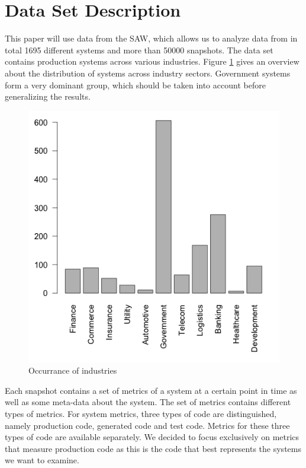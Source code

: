 \section{Data Set Description}
\label{sec:datasetdescription}
This paper will use data from the SAW, which allows us to analyze data from  in total 1695 different systems and more than 50000 snapshots. The data set contains production systems across various industries. Figure \ref{fig:industries} gives an overview about the distribution of systems across industry sectors. Government systems form a very dominant group, which should be taken into account before generalizing the results.

\begin{figure}
\centering
\includegraphics[width=\linewidth]{figs/ind_occ.png}
\caption{Occurrance of industries}
\label{fig:industries}
\end{figure}

Each snapshot contains a set of metrics of a system at a certain point in time as well as some meta-data about the system. The set of metrics contains different types of metrics. For system metrics, three types of code are distinguished, namely production code, generated code and test code. Metrics for these three types of code are available separately. We decided to focus exclusively on metrics that measure production code as this is the code that best represents the systems we want to examine.

